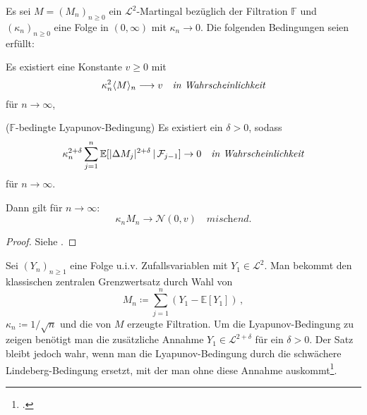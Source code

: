 \documentclass[ngerman,a4paper,11pt]{scrartcl}
\newcommand{\EE}{\mathbb{E}}
\newcommand{\FF}{\mathbb{F}}
\newcommand{\ff}{\mathcal{F}}
\renewcommand{\ll}{\mathcal{L}}
\newcommand{\nn}{\mathcal{N}}
\newcommand{\expect}[1]{\EE[#1]}
\newcommand{\condexp}[2]{\EE[#1\,|\,#2]}
\DeclarePairedDelimiter{\sprod}{\langle}{\rangle}	%
\DeclarePairedDelimiter{\abs}{\lvert}{\rvert}		%
\begin{document}
\begin{thm}\label{thm:clt}
  Es sei $M=(M_n)_{n\geq 0}$ ein $\ll^2$-Martingal bezüglich der Filtration
  $\FF$ und $(\kappa_n)_{n\geq 0}$ eine Folge in $(0,\infty)$ mit $\kappa_n\to 0$. Die
  folgenden Bedingungen seien erfüllt:
 \begin{thmasslist}
 \item Es existiert eine Konstante $v\geq 0$ mit \label{clt:vora}
   \begin{equation*}
     \kappa_n^2\sprod{M}_n\longrightarrow v\quad\textit{in Wahrscheinlichkeit}
   \end{equation*}
   für $n\to\infty$,
 \item ($\FF$-bedingte Lyapunov-Bedingung) Es existiert ein $\delta >0$, sodass \label{clt:vorb}
   \begin{equation*}
    \kappa_n^{2+\delta} \sum_{j=1}^n\condexp{\abs{\Delta M_j}^{2+\delta}}{\ff_{j-1}}\to 0\quad\textit{in Wahrscheinlichkeit}
   \end{equation*}
für ${n\to\infty}$.
 \end{thmasslist}
Dann gilt für ${n\to\infty}$:
\begin{equation*}
 \kappa_nM_n\to\nn(0,v)\quad\textit{mischend.} 
\end{equation*}
\end{thm}
\begin{proof}
 Siehe \cite[Satz~5.31 und Bemerkung~5.32(a)]{lusch}.
\end{proof}
\begin{rem}
 Sei $(Y_n)_{n\geq 1}$ eine Folge u.i.v. Zufallsvariablen mit $Y_1\in\ll^2$. Man bekommt den
 klassischen zentralen Grenzwertsatz durch Wahl von 
 \begin{equation*}
  M_n\coloneqq \sum_{j=1}^n(Y_1-\expect{Y_1})\,,
 \end{equation*}
 $\kappa_n\coloneqq 1/\sqrt{n}$ und die von $M$ erzeugte Filtration. Um die
 Lyapunov-Bedingung zu zeigen benötigt man die zusätzliche Annahme
 $Y_1\in\ll^{2+\delta}$ für ein $\delta>0$. Der Satz bleibt jedoch wahr, wenn
 man die Lyapunov-Bedingung durch die schwächere Lindeberg-Bedingung ersetzt,
 mit der man ohne diese Annahme auskommt\footcite[Korollar 5.33]{lusch}.
\end{rem}
\end{document}
